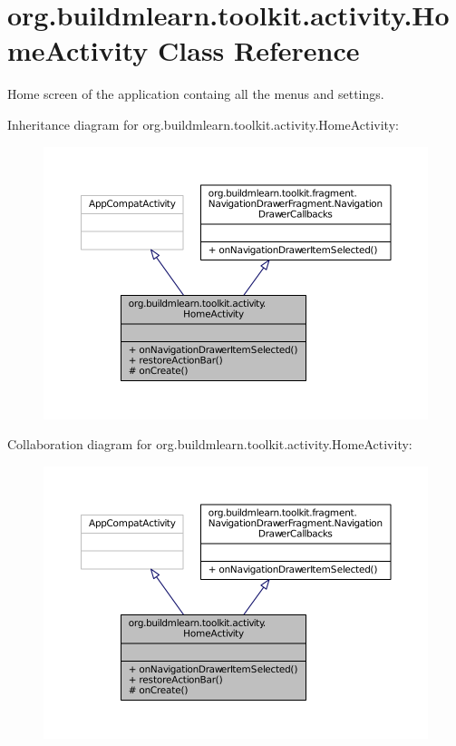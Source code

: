 \hypertarget{classorg_1_1buildmlearn_1_1toolkit_1_1activity_1_1HomeActivity}{\section{org.\-buildmlearn.\-toolkit.\-activity.\-Home\-Activity Class Reference}
\label{classorg_1_1buildmlearn_1_1toolkit_1_1activity_1_1HomeActivity}
}


Home screen of the application containg all the menus and settings.  




Inheritance diagram for org.\-buildmlearn.\-toolkit.\-activity.\-Home\-Activity\-:
\nopagebreak
\begin{figure}[H]
\begin{center}
\leavevmode
\includegraphics[width=350pt]{dd/d80/classorg_1_1buildmlearn_1_1toolkit_1_1activity_1_1HomeActivity__inherit__graph}
\end{center}
\end{figure}


Collaboration diagram for org.\-buildmlearn.\-toolkit.\-activity.\-Home\-Activity\-:
\nopagebreak
\begin{figure}[H]
\begin{center}
\leavevmode
\includegraphics[width=350pt]{d3/d43/classorg_1_1buildmlearn_1_1toolkit_1_1activity_1_1HomeActivity__coll__graph}
\end{center}
\end{figure}
